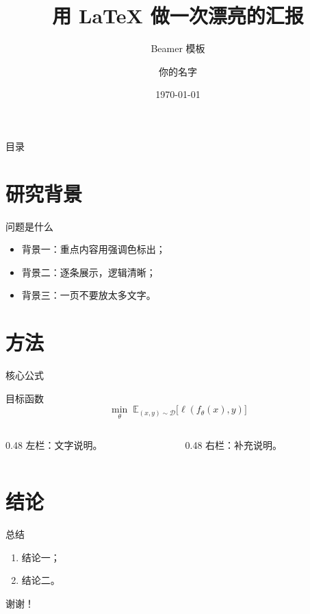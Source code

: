 \documentclass[11pt,aspectratio=169]{beamer}
\title{用 \LaTeX{} 做一次漂亮的汇报}
\subtitle{Beamer 模板}
\author{你的名字}
\institute{某某大学}
\date{\today}
\begin{document}
\begin{frame}
  \titlepage
\end{frame}

\begin{frame}{目录}
  \tableofcontents
\end{frame}

\section{研究背景}

\begin{frame}{问题是什么}
  \begin{itemize}
    \item 背景一：\alert{重点内容}用强调色标出；
    \item 背景二：逐条展示，逻辑清晰；
    \item 背景三：一页不要放太多文字。
  \end{itemize}
\end{frame}

\section{方法}

\begin{frame}{核心公式}
  \begin{block}{目标函数}
    \begin{equation}
      \min_{\theta}\; \mathbb{E}_{(x,y)\sim\mathcal{D}}\bigl[\ell(f_\theta(x), y)\bigr]
    \end{equation}
  \end{block}

  \begin{columns}
    \begin{column}{0.48\textwidth}
      左栏：文字说明。
    \end{column}
    \begin{column}{0.48\textwidth}
      右栏：补充说明。
    \end{column}
  \end{columns}
\end{frame}

\section{结论}

\begin{frame}{总结}
  \begin{enumerate}
    \item 结论一；
    \item 结论二。
  \end{enumerate}
  \vspace{1em}
  \centering \Large 谢谢！
\end{frame}
\end{document}
